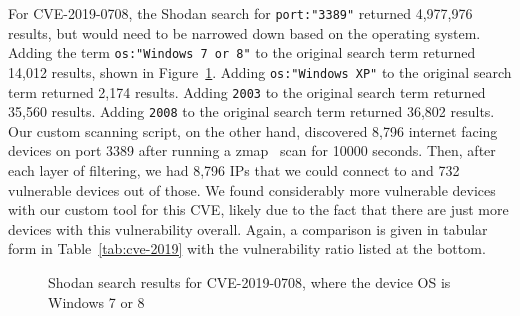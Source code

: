 For CVE-2019-0708, the Shodan search for \verb|port:"3389"| returned
4,977,976 results, but would need to be narrowed down based on the operating
system. Adding the term \verb|os:"Windows 7 or 8"| to the original search term returned
14,012 results, shown in Figure~\ref{fig:shodan-windows-78}. Adding
\verb|os:"Windows XP"| to the original search term
returned 2,174 results. Adding \verb|2003| to the original search term returned
35,560 results. Adding \verb|2008| to the original search term returned 36,802
results. Our custom scanning script, on the other hand, discovered 8,796 internet
facing devices on port 3389 after running a zmap~\cite{zmap} scan for 10000 seconds.
Then, after each layer of filtering, we had 8,796 IPs that we could connect to and
732 vulnerable devices out of those. We found considerably more vulnerable devices
with our custom tool for this CVE, likely due to the fact that there are just 
more devices with this vulnerability overall. Again, a comparison is given in tabular
form in Table~\ref{tab:cve-2019} with the vulnerability ratio listed at the bottom.

\begin{figure}[!h]
\begin{center}
\caption{Shodan search results for CVE-2019-0708, where the device OS is Windows 7 or 8}
\label{fig:shodan-windows-78}
\end{center}
\end{figure}

